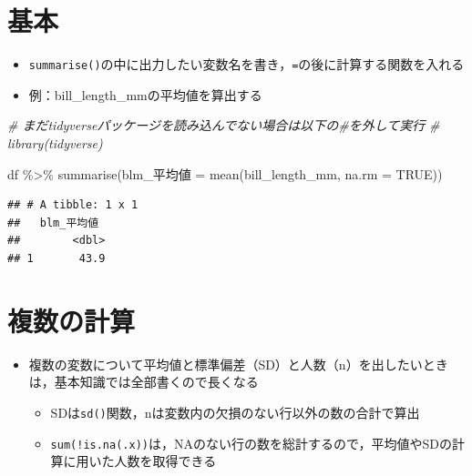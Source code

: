 \documentclass[
  xelatex,ja=standard, b5paper]{bxjsbook}
\newenvironment{Shaded}{\begin{snugshade}}{\end{snugshade}}
\newcommand{\AttributeTok}[1]{\textcolor[rgb]{0.77,0.63,0.00}{#1}}
\newcommand{\CommentTok}[1]{\textcolor[rgb]{0.56,0.35,0.01}{\textit{#1}}}
\newcommand{\ConstantTok}[1]{\textcolor[rgb]{0.00,0.00,0.00}{#1}}
\newcommand{\FunctionTok}[1]{\textcolor[rgb]{0.00,0.00,0.00}{#1}}
\newcommand{\NormalTok}[1]{#1}
\newcommand{\OtherTok}[1]{\textcolor[rgb]{0.56,0.35,0.01}{#1}}
\newcommand{\SpecialCharTok}[1]{\textcolor[rgb]{0.00,0.00,0.00}{#1}}
\providecommand{\tightlist}{%
  \setlength{\itemsep}{0pt}\setlength{\parskip}{0pt}}
\begin{document}
\hypertarget{su-st}{%
\section{基本}\label{su-st}}

\begin{itemize}
\tightlist
\item
  \texttt{summarise()}の中に出力したい変数名を書き，\texttt{=}の後に計算する関数を入れる
\item
  例：bill\_length\_mmの平均値を算出する
\end{itemize}

\begin{Shaded}
\begin{Highlighting}[]
\CommentTok{\# まだtidyverseパッケージを読み込んでない場合は以下の\#を外して実行}
\CommentTok{\# library(tidyverse)}

\NormalTok{df }\SpecialCharTok{\%\textgreater{}\%} 
  \FunctionTok{summarise}\NormalTok{(blm\_平均値 }\OtherTok{=} \FunctionTok{mean}\NormalTok{(bill\_length\_mm, }\AttributeTok{na.rm =} \ConstantTok{TRUE}\NormalTok{))}
\end{Highlighting}
\end{Shaded}

\begin{verbatim}
## # A tibble: 1 x 1
##   blm_平均値
##        <dbl>
## 1       43.9
\end{verbatim}

\hypertarget{su-st-multiple}{%
\section{複数の計算}\label{su-st-multiple}}

\begin{itemize}
\tightlist
\item
  複数の変数について平均値と標準偏差（SD）と人数（n）を出したいときは，基本知識では全部書くので長くなる

  \begin{itemize}
  \tightlist
  \item
    SDは\texttt{sd()}関数，nは変数内の欠損のない行以外の数の合計で算出
  \item
    \texttt{sum(!is.na(.x))}は，NAのない行の数を総計するので，平均値やSDの計算に用いた人数を取得できる
  \end{itemize}
\end{itemize}
\end{document}
